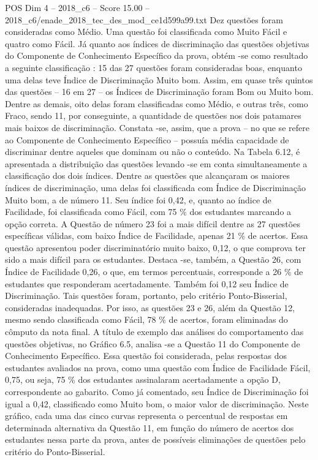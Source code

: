 \begin{textsample}{POS Dim 4 – 2018\_c6 – Score 15.00 – 2018\_c6/enade\_2018\_tec\_des\_mod\_ce1d599a99.txt}
Dez questões foram consideradas como Médio.
Uma questão foi classificada como Muito Fácil e quatro como Fácil.
Já quanto aos índices de discriminação das questões objetivas do Componente de Conhecimento Específico da prova, obtém -se como resultado a seguinte classificação : 15 das 27 questões foram consideradas boas, enquanto uma delas teve Índice de Discriminação Muito bom.
Assim, em quase três quintos das questões – 16 em 27 – os Índices de Discriminação foram Bom ou Muito bom.
Dentre as demais, oito delas foram classificadas como Médio, e outras três, como Fraco, sendo 11, por conseguinte, a quantidade de questões nos dois patamares mais baixos de discriminação.
Constata -se, assim, que a prova – no que se refere ao Componente de Conhecimento Específico – possuía média capacidade de discriminar dentre aqueles que dominam ou não o conteúdo.
Na Tabela 6.12, é apresentada a distribuição das questões levando -se em conta simultaneamente a classificação dos dois índices.
Dentre as questões que alcançaram os maiores índices de discriminação, uma delas foi classificada com Índice de Discriminação Muito bom, a de número 11.
Seu índice foi 0,42, e, quanto ao índice de Facilidade, foi classificada como Fácil, com 75 \% dos estudantes marcando a opção correta.
A Questão de número 23 foi a mais difícil dentre as 27 questões específicas válidas, com baixo Índice de Facilidade, apenas 21 \% de acertos.
Essa questão apresentou poder discriminatório muito baixo, 0,12, o que comprova ter sido a mais difícil para os estudantes.
Destaca -se, também, a Questão 26, com Índice de Facilidade 0,26, o que, em termos percentuais, corresponde a 26 \% de estudantes que responderam acertadamente.
Também foi 0,12 seu Índice de Discriminação.
Tais questões foram, portanto, pelo critério Ponto-Bisserial, consideradas inadequadas.
Por isso, as questões 23 e 26, além da Questão 12, mesmo sendo classificada como Fácil, 78 \% de acertos, foram eliminadas do cômputo da nota final.
A título de exemplo das análises do comportamento das questões objetivas, no Gráfico 6.5, analisa -se a Questão 11 do Componente de Conhecimento Específico.
Essa questão foi considerada, pelas respostas dos estudantes avaliados na prova, como uma questão com Índice de Facilidade Fácil, 0,75, ou seja, 75 \% dos estudantes assinalaram acertadamente a opção D, correspondente ao gabarito.
Como já comentado, seu Índice de Discriminação foi igual a 0,42, classificado como Muito bom, o maior valor de discriminação.
Neste gráfico, cada uma das cinco curvas representa o percentual de respostas em determinada alternativa da Questão 11, em função do número de acertos dos estudantes nessa parte da prova, antes de possíveis eliminações de questões pelo critério do Ponto-Bisserial.

\end{textsample}
